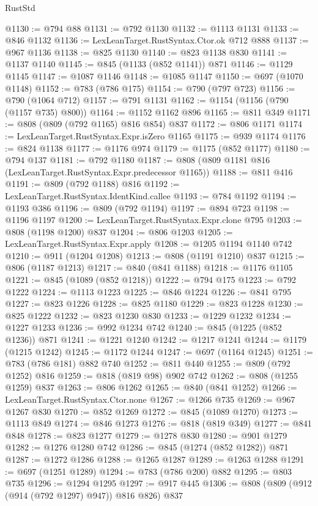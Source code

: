 \begin{lexlean}{RustStd}
\begin{coremodule}
@1130 := @794 @88
@1131 := @792 @1130
@1132 := @1113 @1131
@1133 := @846 @1132
@1136 := LexLeanTarget.RustSyntax.Ctor.ok @712 @888
@1137 := @967 @1136
@1138 := @825 @1130
@1140 := @823 @1138 @830
@1141 := @1137 @1140
@1145 := @845 (@1133 (@852 @1141)) @871
@1146 := @1129 @1145
@1147 := @1087 @1146
@1148 := @1085 @1147
@1150 := @697 (@1070 @1148)
@1152 := @783 (@786 @175)
@1154 := @790 (@797 @723)
@1156 := @790 (@1064 @712)
@1157 := @791 @1131
@1162 := @1154 (@1156 (@790 (@1157 @735) @800))
@1164 := @1152 @1162 @896
@1165 := @811 @349
@1171 := @808 (@809 (@792 @1165) @816 @854) @837
@1172 := @806 @1171
@1174 := LexLeanTarget.RustSyntax.Expr.isZero @1165
@1175 := @939 @1174
@1176 := @824 @1138
@1177 := @1176 @974
@1179 := @1175 (@852 @1177)
@1180 := @794 @137
@1181 := @792 @1180
@1187 := @808 (@809 @1181 @816 (LexLeanTarget.RustSyntax.Expr.predecessor @1165))
@1188 := @811 @416
@1191 := @809 (@792 @1188) @816
@1192 := LexLeanTarget.RustSyntax.IdentKind.callee
@1193 := @784 @1192
@1194 := @1193 @386
@1196 := @809 (@792 @1194)
@1197 := @894 @723
@1198 := @1196 @1197
@1200 := LexLeanTarget.RustSyntax.Expr.clone @795
@1203 := @808 (@1198 @1200) @837
@1204 := @806 @1203
@1205 := LexLeanTarget.RustSyntax.Expr.apply
@1208 := @1205 @1194 @1140 @742
@1210 := @911 (@1204 @1208)
@1213 := @808 (@1191 @1210) @837
@1215 := @806 (@1187 @1213)
@1217 := @840 (@841 @1188)
@1218 := @1176 @1105
@1221 := @845 (@1089 (@852 @1218))
@1222 := @794 @175
@1223 := @792 @1222
@1224 := @1113 @1223
@1225 := @846 @1224
@1226 := @841 @795
@1227 := @823 @1226
@1228 := @825 @1180
@1229 := @823 @1228
@1230 := @825 @1222
@1232 := @823 @1230 @830
@1233 := @1229 @1232
@1234 := @1227 @1233
@1236 := @992 @1234 @742
@1240 := @845 (@1225 (@852 @1236)) @871
@1241 := @1221 @1240
@1242 := @1217 @1241
@1244 := @1179 (@1215 @1242)
@1245 := @1172 @1244
@1247 := @697 (@1164 @1245)
@1251 := @783 (@786 @181) @882 @740
@1252 := @811 @440
@1255 := @809 (@792 @1252) @816
@1259 := @818 (@819 @98) @902 @742
@1262 := @808 (@1255 @1259) @837
@1263 := @806 @1262
@1265 := @840 (@841 @1252)
@1266 := LexLeanTarget.RustSyntax.Ctor.none
@1267 := @1266 @735
@1269 := @967 @1267 @830
@1270 := @852 @1269
@1272 := @845 (@1089 @1270)
@1273 := @1113 @849
@1274 := @846 @1273
@1276 := @818 (@819 @349)
@1277 := @841 @848
@1278 := @823 @1277
@1279 := @1278 @830
@1280 := @901 @1279
@1282 := @1276 @1280 @742
@1286 := @845 (@1274 (@852 @1282)) @871
@1287 := @1272 @1286
@1288 := @1265 @1287
@1289 := @1263 @1288
@1291 := @697 (@1251 @1289)
@1294 := @783 (@786 @200) @882
@1295 := @803 @735
@1296 := @1294 @1295
@1297 := @917 @445
@1306 := @808 (@809 (@912 (@914 (@792 @1297) @947)) @816 @826) @837

\end{coremodule}
\end{lexlean}
